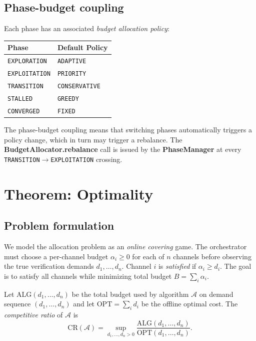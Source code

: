 \documentclass[11pt]{article}
\providecommand{\Alloc}{\alpha}                %
\providecommand{\OPT}{\mathrm{OPT}}           %
\providecommand{\ALG}{\mathrm{ALG}}           %
\providecommand{\CR}{\mathrm{CR}}             %
\begin{document}
\subsection{Phase-budget coupling}

Each phase has an associated \emph{budget allocation policy}:
\begin{center}
\begin{tabular}{ll}
\toprule
Phase & Default Policy \\
\midrule
\texttt{EXPLORATION} & \texttt{ADAPTIVE} \\
\texttt{EXPLOITATION} & \texttt{PRIORITY} \\
\texttt{TRANSITION} & \texttt{CONSERVATIVE} \\
\texttt{STALLED} & \texttt{GREEDY} \\
\texttt{CONVERGED} & \texttt{FIXED} \\
\bottomrule
\end{tabular}
\end{center}

The phase-budget coupling means that switching phases automatically
triggers a policy change, which in turn may trigger a rebalance.
The \textbf{BudgetAllocator.rebalance} call is issued by the
\textbf{PhaseManager} at every \texttt{TRANSITION}$\to$\texttt{EXPLOITATION}
crossing.

\section{Theorem: Optimality}\label{sec:optimality}

\subsection{Problem formulation}

We model the allocation problem as an \emph{online covering} game.
The orchestrator must choose a per-channel budget $\Alloc_i \ge 0$
for each of $n$ channels before observing the true verification
demands $d_1, \ldots, d_n$.  Channel $i$ is \emph{satisfied} if
$\Alloc_i \ge d_i$.  The goal is to satisfy all channels while
minimizing total budget $B = \sum_i \Alloc_i$.

\begin{definition}\label{def:cr}
Let $\ALG(d_1,\ldots,d_n)$ be the total budget used by algorithm
$\mathcal{A}$ on demand sequence $(d_1,\ldots,d_n)$ and let
$\OPT = \sum_i d_i$ be the offline optimal cost.  The
\emph{competitive ratio} of $\mathcal{A}$ is
\[
  \CR(\mathcal{A}) = \sup_{d_1,\ldots,d_n > 0}
  \frac{\ALG(d_1,\ldots,d_n)}{\OPT(d_1,\ldots,d_n)}.
\]
\end{definition}
\end{document}
